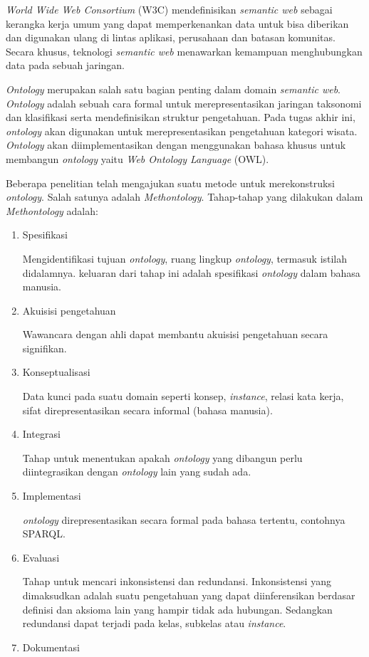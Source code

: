 \textit{World Wide Web Consortium} (W3C) mendefinisikan \textit{semantic web} sebagai kerangka kerja umum yang dapat memperkenankan data untuk bisa diberikan dan digunakan ulang di lintas aplikasi, perusahaan dan batasan komunitas. Secara khusus, teknologi \textit{semantic web} menawarkan kemampuan menghubungkan data pada sebuah jaringan.
\par
\textit{Ontology} merupakan salah satu bagian penting dalam domain \textit{semantic web}. \textit{Ontology} adalah sebuah cara formal untuk merepresentasikan jaringan taksonomi dan klasifikasi serta mendefinisikan struktur pengetahuan. Pada tugas akhir ini, \textit{ontology} akan digunakan untuk merepresentasikan pengetahuan kategori wisata. \textit{Ontology} akan diimplementasikan dengan menggunakan bahasa khusus untuk membangun \textit{ontology} yaitu \textit{Web Ontology Language} (OWL).
\par
Beberapa penelitian telah mengajukan suatu metode untuk merekonstruksi \textit{ontology}. Salah satunya adalah \textit{Methontology}\cite{jones1998methodologies}. Tahap-tahap yang dilakukan dalam \textit{Methontology} adalah:
\begin{enumerate}
	\item Spesifikasi \par Mengidentifikasi tujuan \textit{ontology}, ruang lingkup \textit{ontology}, termasuk istilah didalamnya. keluaran dari tahap ini adalah spesifikasi \textit{ontology} dalam bahasa manusia.
	\item Akuisisi pengetahuan \par Wawancara dengan ahli dapat membantu akuisisi pengetahuan secara signifikan.
	\item Konseptualisasi  \par Data kunci pada suatu domain seperti konsep, \textit{instance}, relasi kata kerja, sifat direpresentasikan secara informal (bahasa manusia).
	\item Integrasi  \par Tahap untuk menentukan apakah \textit{ontology} yang dibangun perlu diintegrasikan dengan \textit{ontology} lain yang sudah ada.
	\item Implementasi \par \textit{ontology} direpresentasikan secara formal pada bahasa tertentu, contohnya SPARQL. 
	\item Evaluasi \par Tahap untuk mencari inkonsistensi dan redundansi. Inkonsistensi yang dimaksudkan adalah suatu pengetahuan yang dapat diinferensikan berdasar definisi dan aksioma lain yang hampir tidak ada hubungan. Sedangkan redundansi dapat terjadi pada kelas, subkelas atau \textit{instance}.
	\item Dokumentasi
\end{enumerate}



